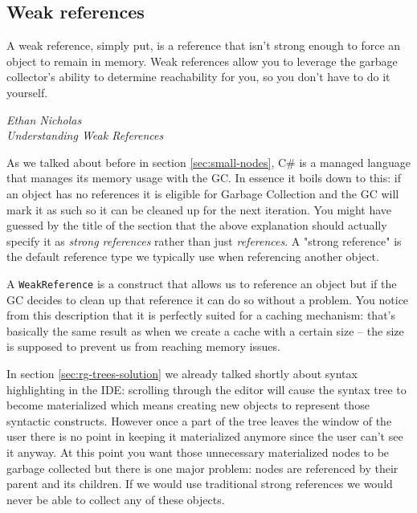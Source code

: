 \subsection{Weak references}
\label{sec:weak-references}

\epigraph{A weak reference, simply put, is a reference that isn't strong enough to force an object to remain in memory. Weak references allow you to leverage the garbage collector's ability to determine reachability for you, so you don't have to do it yourself.}
{\textit{Ethan Nicholas \\ \footnotesize{Understanding Weak References\protect\footnotemark}}}


As we talked about before in section \ref{sec:small-nodes}, C\# is a managed language that manages its memory usage with the GC. In essence it boils down to this: if an object has no references it is eligible for Garbage Collection and the GC will mark it as such so it can be cleaned up for the next iteration. You might have guessed by the title of the section that the above explanation should actually specify it as \textit{strong references} rather than just \textit{references}. A "strong reference" is the default reference type we typically use when referencing another object.

A \verb|WeakReference| is a construct that allows us to reference an object but if the GC decides to clean up that reference it can do so without a problem. You notice from this description that it is perfectly suited for a caching mechanism: that's basically the same result as when we create a cache with a certain size -- the size is supposed to prevent us from reaching memory issues.

In section \ref{sec:rg-trees-solution} we already talked shortly about syntax highlighting in the IDE: scrolling through the editor will cause the syntax tree to become materialized which means creating new objects to represent those syntactic constructs. However once a part of the tree leaves the window of the user there is no point in keeping it materialized anymore since the user can't see it anyway. At this point you want those unnecessary materialized nodes to be garbage collected but there is one major problem: nodes are referenced by their parent and its children. If we would use traditional strong references we would never be able to collect any of these objects.

